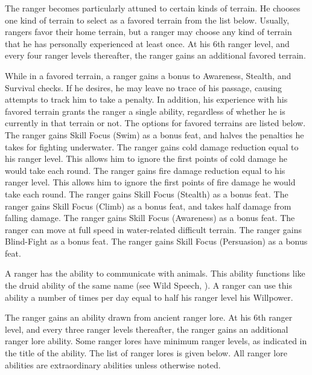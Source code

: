 The ranger becomes particularly attuned to certain kinds of terrain.
He chooses one kind of terrain to select as a favored terrain from the list below.
Usually, rangers favor their home terrain, but a ranger may choose any kind of terrain that he has personally experienced at least once.
At his 6th ranger level, and every four ranger levels thereafter, the ranger gains an additional favored terrain.
\par While in a favored terrain, a ranger gains a  bonus to Awareness, Stealth, and Survival checks.
If he desires, he may leave no trace of his passage, causing attempts to track him to take a  penalty.
In addition, his experience with his favored terrain grants the ranger a single ability, regardless of whether he is currently in that terrain or not.
The options for favored terrains are listed below.
The ranger gains Skill Focus (Swim) as a bonus feat, and halves the penalties he takes for fighting underwater.
The ranger gains cold damage reduction equal to his ranger level.
This allows him to ignore the first points of cold damage he would take each round.
The ranger gains fire damage reduction equal to his ranger level.
This allows him to ignore the first points of fire damage he would take each round.
The ranger gains Skill Focus (Stealth) as a bonus feat.
The ranger gains Skill Focus (Climb) as a bonus feat, and takes half damage from falling damage.
The ranger gains Skill Focus (Awareness) as a bonus feat.
The ranger can move at full speed in water-related difficult terrain.
The ranger gains Blind-Fight as a bonus feat.
The ranger gains Skill Focus (Persuasion) as a bonus feat.

A ranger has the ability to communicate with animals.
This ability functions like the druid ability of the same name (see Wild Speech, ).
A ranger can use this ability a number of times per day equal to half his ranger level \add his Willpower.

The ranger gains an ability drawn from ancient ranger lore.
At his 6th ranger level, and every three ranger levels thereafter, the ranger gains an additional ranger lore ability.
Some ranger lores have minimum ranger levels, as indicated in the title of the ability.
The list of ranger lores is given below.
All ranger lore abilities are extraordinary abilities unless otherwise noted.

